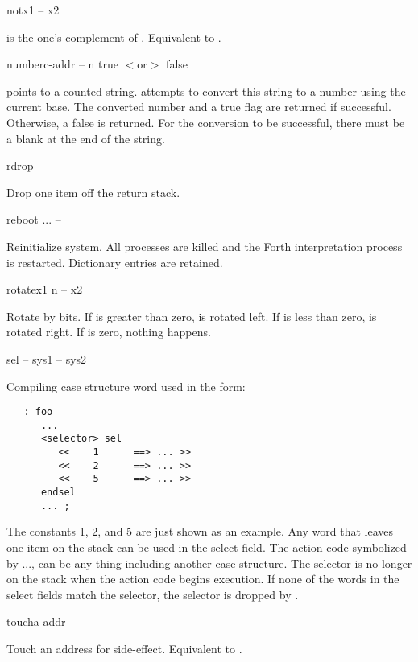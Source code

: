 \begin{gloss}{not}{x1 -- x2}

 is the one's complement of .  Equivalent to .
\end{gloss}
\begin{gloss}{number}{c-addr -- n true $<$or$>$ false}

 points to a counted string.  
attempts to convert this string
to a number using the current base.  The converted number 
and a true flag
are returned if successful.  Otherwise, a false is returned.  For the
conversion to be successful, there must be a blank at the end
of the string.
\end{gloss}
\begin{gloss}{rdrop}{ -- }

Drop one item off the return stack.
\end{gloss}
\begin{gloss}{reboot}{ ... -- }

Reinitialize system.  All processes are killed and the Forth
interpretation process is restarted.  Dictionary entries are
retained.
\end{gloss}
\begin{gloss}{rotate}{x1 n -- x2}

Rotate  by  bits.  If  is greater than zero,
 is rotated left.  If
 is less than zero,  is rotated right.  If 
is zero, nothing happens.
\end{gloss}
\begin{cgloss}{sel}{ -- }{sys1 -- sys2}

Compiling case structure word used in the form:
\begin{verbatim}
   : foo
      ...
      <selector> sel
         <<    1      ==> ... >>
         <<    2      ==> ... >>
         <<    5      ==> ... >>
      endsel
	  ... ;
\end{verbatim}
The constants 1, 2, and 5 are just shown as an example.  Any word that
leaves
one item on the stack can be used in the select field.  The action code 
symbolized by ..., can be any thing including another case structure.  The
selector is no longer on the stack when the action code begins execution.
If none of the words in the select
fields match the selector, the selector is dropped by .
\end{cgloss}
\begin{gloss}{touch}{a-addr -- }

Touch an address for side-effect.  Equivalent to .
\end{gloss}
